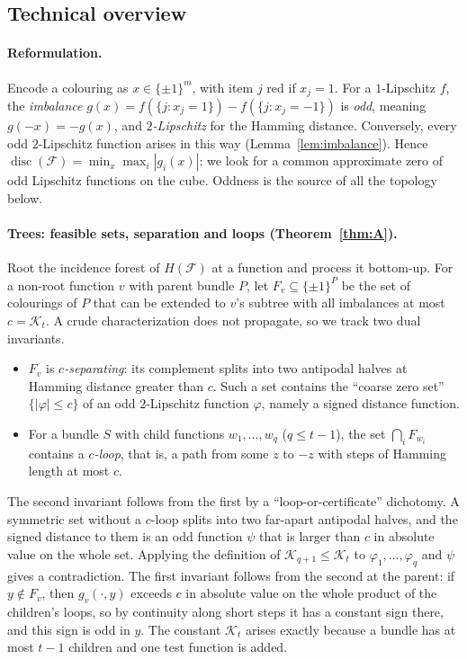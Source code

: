 \documentclass[11pt,letterpaper]{article}
\theoremstyle{definition}
\newcommand{\cF}{\mathcal{F}}
\newcommand{\cube}[1]{\{\pm1\}^{#1}}
\DeclareMathOperator{\disc}{disc}
\begin{document}
\subsection{Technical overview}\label{sec:overview}

\paragraph{Reformulation.}
Encode a colouring as $x\in\cube{m}$, with item $j$ red if $x_j=1$. For a $1$-Lipschitz $f$,
the \emph{imbalance} $g(x)=f(\{j:x_j=1\})-f(\{j:x_j=-1\})$ is \emph{odd}, meaning $g(-x)=-g(x)$,
and \emph{$2$-Lipschitz} for the Hamming distance. Conversely, every odd $2$-Lipschitz function
arises in this way (Lemma~\ref{lem:imbalance}). Hence $\disc(\cF)=\min_x\max_i|g_i(x)|$: we look
for a common approximate zero of odd Lipschitz functions on the cube. Oddness is the source of
all the topology below.

\paragraph{Trees: feasible sets, separation and loops (Theorem~\ref{thm:A}).}
Root the incidence forest of $H(\cF)$ at a function and process it bottom-up. For a non-root
function $v$ with parent bundle $P$, let $F_v\subseteq\cube{P}$ be the set of colourings of $P$
that can be extended to $v$'s subtree with all imbalances at most $c=\mathcal{K}_t$. A crude
characterization does not propagate, so we track two dual invariants.
\begin{itemize}[leftmargin=*,itemsep=1pt]
\item $F_v$ is \emph{$c$-separating}: its complement splits into two antipodal halves at Hamming
distance greater than $c$. Such a set contains the ``coarse zero set'' $\{|\varphi|\le c\}$ of an
odd $2$-Lipschitz function $\varphi$, namely a signed distance function.
\item For a bundle $S$ with child functions $w_1,\dots,w_q$ ($q\le t-1$), the set
$\bigcap_iF_{w_i}$ contains a \emph{$c$-loop}, that is, a path from some $z$ to $-z$ with steps of
Hamming length at most $c$.
\end{itemize}
The second invariant follows from the first by a ``loop-or-certificate'' dichotomy. A symmetric
set without a $c$-loop splits into two far-apart antipodal halves, and the signed distance to
them is an odd function $\psi$ that is larger than $c$ in absolute value on the whole set.
Applying the definition of $\mathcal{K}_{q+1}\le \mathcal{K}_t$ to $\varphi_1,\dots,\varphi_q$ and $\psi$ gives a
contradiction. The first invariant follows from the second at the parent: if $y\notin F_v$, then
$g_v(\cdot,y)$ exceeds $c$ in absolute value on the whole product of the children's loops, so by
continuity along short steps it has a constant sign there, and this sign is odd in $y$. The
constant $\mathcal{K}_t$ arises exactly because a bundle has at most $t-1$ children and one test function
is added.
\end{document}

